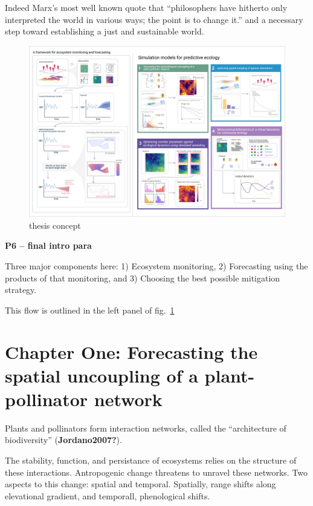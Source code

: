 \documentclass[10pt,oneside]{article}
\makeatletter
\def\maxwidth{\ifdim\Gin@nat@width>\linewidth\linewidth
\else\Gin@nat@width\fi}
\let\Oldincludegraphics\includegraphics
\renewcommand{\includegraphics}[1]{\Oldincludegraphics[width=\maxwidth]{#1}}
\makeatother
\begin{document}
Indeed Marx's most well known quote that ``philosophers have hitherto
only interpreted the world in various ways; the point is to change it.''
and a necessary step toward establishing a just and sustainable world.

\begin{figure}
\hypertarget{fig:thesis}{%
\centering
\includegraphics{./figures/thesisconcept.png}
\caption{thesis concept}\label{fig:thesis}
}
\end{figure}

\textbf{P6 -- final intro para}

Three major components here: 1) Ecosystem monitoring, 2) Forecasting
using the products of that monitoring, and 3) Choosing the best possible
mitigation strategy.

This flow is outlined in the left panel of fig.~\ref{fig:thesis}

\hypertarget{chapter-one-forecasting-the-spatial-uncoupling-of-a-plant-pollinator-network}{%
\section{Chapter One: Forecasting the spatial uncoupling of a
plant-pollinator
network}\label{chapter-one-forecasting-the-spatial-uncoupling-of-a-plant-pollinator-network}}

Plants and pollinators form interaction networks, called the
``architecture of biodiversity'' (\textbf{Jordano2007?}).

The stability, function, and persistance of ecosystems relies on the
structure of these interactions. Antropogenic change threatens to
unravel these networks. Two aspects to this change: spatial and
temporal. Spatially, range shifts along elevational gradient, and
temporall, phenological shifts.
\end{document}
